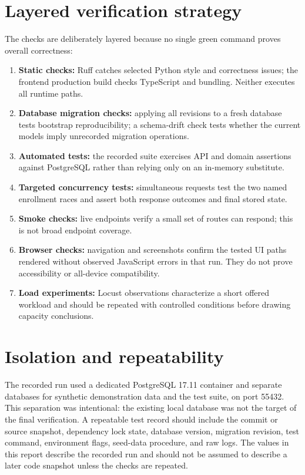 \documentclass[11pt,a4paper,oneside]{report}
\begin{document}
\section{Layered verification strategy}
The checks are deliberately layered because no single green command proves overall correctness:
\begin{enumerate}
\item \textbf{Static checks:} Ruff catches selected Python style and correctness issues; the frontend production build checks TypeScript and bundling. Neither executes all runtime paths.
\item \textbf{Database migration checks:} applying all revisions to a fresh database tests bootstrap reproducibility; a schema-drift check tests whether the current models imply unrecorded migration operations.
\item \textbf{Automated tests:} the recorded suite exercises API and domain assertions against PostgreSQL rather than relying only on an in-memory substitute.
\item \textbf{Targeted concurrency tests:} simultaneous requests test the two named enrollment races and assert both response outcomes and final stored state.
\item \textbf{Smoke checks:} live endpoints verify a small set of routes can respond; this is not broad endpoint coverage.
\item \textbf{Browser checks:} navigation and screenshots confirm the tested UI paths rendered without observed JavaScript errors in that run. They do not prove accessibility or all-device compatibility.
\item \textbf{Load experiments:} Locust observations characterize a short offered workload and should be repeated with controlled conditions before drawing capacity conclusions.
\end{enumerate}

\section{Isolation and repeatability}
The recorded run used a dedicated PostgreSQL 17.11 container and separate databases for synthetic demonstration data and the test suite, on port 55432. This separation was intentional: the existing local database was not the target of the final verification. A repeatable test record should include the commit or source snapshot, dependency lock state, database version, migration revision, test command, environment flags, seed-data procedure, and raw logs. The values in this report describe the recorded run and should not be assumed to describe a later code snapshot unless the checks are repeated.
\end{document}
